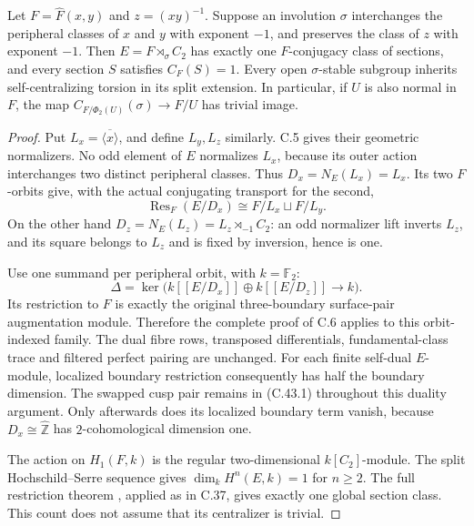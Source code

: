 Let $F=\widehat F(x,y)$ and $z=(xy)^{-1}$. Suppose an involution
$\sigma$ interchanges the peripheral classes of $x$ and $y$ with
exponent $-1$, and preserves the class of $z$ with exponent $-1$.
Then $E=F\rtimes_\sigma C_2$ has exactly one $F$-conjugacy class
of sections, and every section $S$ satisfies $C_F(S)=1$.
Every open $\sigma$-stable subgroup inherits self-centralizing
torsion in its split extension. In particular, if $U$ is also normal
in $F$, the map $C_{F/\Phi_2(U)}(\sigma)\to F/U$ has trivial image.

\begin{proof}
Put $L_x=\overline{\langle x\rangle}$, and define $L_y,L_z$
similarly. C.5 gives their geometric normalizers. No odd element of
$E$ normalizes $L_x$, because its outer action interchanges two
distinct peripheral classes. Thus $D_x=N_E(L_x)=L_x$. Its two
$F$-orbits give, with the actual conjugating transport for the second,
\[
 \operatorname{Res}_F(E/D_x)\cong F/L_x\sqcup F/L_y.
\]
On the other hand $D_z=N_E(L_z)=L_z\rtimes_{-1}C_2$: an odd
normalizer lift inverts $L_z$, and its square belongs to $L_z$
and is fixed by inversion, hence is one.

Use one summand per peripheral orbit, with $k=\mathbb F_2$:
\[
 \Delta=\ker\bigl(k[[E/D_x]]\oplus k[[E/D_z]]\longrightarrow k\bigr).
                                                                    \tag{C.43.1}
\]
Its restriction to $F$ is exactly the original three-boundary
surface-pair augmentation module. Therefore the complete proof of
C.6 applies to this orbit-indexed family. The dual fibre rows,
transposed differentials, fundamental-class trace and filtered
perfect pairing are unchanged. For each finite self-dual $E$-module,
localized boundary restriction consequently has half the boundary
dimension. The swapped cusp pair remains in (C.43.1) throughout this
duality argument. Only afterwards does its localized boundary term
vanish, because $D_x\cong\widehat{\mathbb Z}$ has
$2$-cohomological dimension one.

The action on $H_1(F,k)$ is the regular two-dimensional
$k[C_2]$-module. The split Hochschild--Serre sequence gives
$\dim_kH^n(E,k)=1$ for $n\ge2$. The full restriction theorem
\cite[Theorem 2]{CEKochloukovaZalesskii2007}, applied as in
C.37, gives exactly one global section class. This count does not
assume that its centralizer is trivial.


\end{proof}
